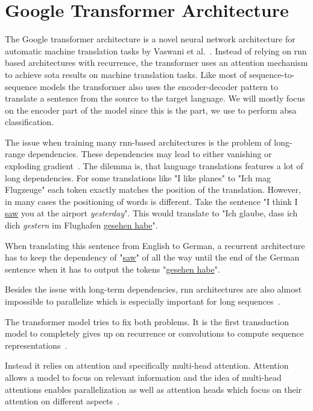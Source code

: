 \section{Google Transformer Architecture}
\label{sec:03_transformer}
The Google transformer architecture is a novel neural network architecture for automatic machine translation tasks by Vaswani et al.~\cite{Vaswani2017d}. Instead of relying on \gls{rnn} based architectures with recurrence, the transformer uses an attention mechanism to achieve \gls{sota} results on machine translation tasks. Like most of sequence-to-sequence models the transformer also uses the encoder-decoder pattern to translate a sentence from the source to the target language. We will mostly focus on the encoder part of the model since this is the part, we use to perform \gls{absa} classification.
\medskip

The issue when training many \gls{rnn}-based architectures is the problem of long-range dependencies. These dependencies may lead to either vanishing or exploding gradient~\cite{Hochreiter2009}. The dilemma is, that language translations features a lot of long dependencies. For some translations like "I like planes" to "Ich mag Flugzeuge" each token exactly matches the position of the translation. However, in many cases the positioning of words is different. Take the sentence "I think I \underline{saw} you at the airport \emph{yesterday}". This would translate to "Ich glaube, dass ich dich \emph{gestern} im Flughafen \underline{gesehen habe}".

When translating this sentence from English to German, a recurrent architecture has to keep the dependency of "\underline{saw}" of all the way until the end of the German sentence when it has to output the tokens "\underline{gesehen habe}".
\medskip

Besides the issue with long-term dependencies, \gls{rnn} architectures are also almost impossible to parallelize which is especially important for long sequences~\cite{Vaswani2017d}.
\medskip

The transformer model tries to fix both problems. It is the first transduction model to completely gives up on recurrence or convolutions to compute sequence representations~\cite{Vaswani2017d}. 

Instead it relies on attention and specifically multi-head attention. Attention allows a model to focus on relevant information and the idea of multi-head attentions enables parallelization as well as attention heads which focus on their attention on different aspects~\cite{Vaswani2017d}.

